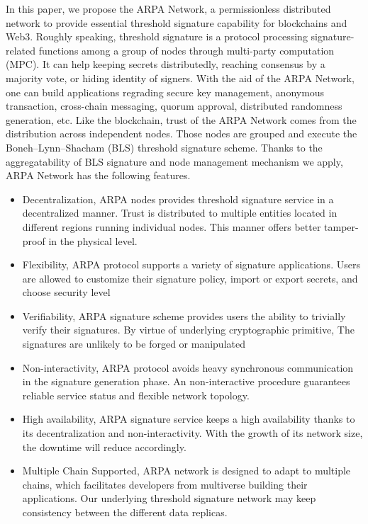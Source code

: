 \documentclass[11pt]{article}
\begin{document}
In this paper, we propose the ARPA Network, a permissionless distributed network to provide essential threshold signature capability for blockchains and Web3. Roughly speaking, threshold signature is a protocol processing signature-related functions among a group of nodes through multi-party computation (MPC). It can help keeping secrets distributedly, reaching consensus by a majority vote, or hiding identity of signers. With the aid of the ARPA Network, one can build applications regrading secure key management, anonymous transaction, cross-chain messaging, quorum approval, distributed randomness generation, etc. Like the blockchain, trust of the ARPA Network comes from the distribution across independent nodes. Those nodes are grouped and execute the Boneh–Lynn–Shacham (BLS) threshold signature scheme. Thanks to the aggregatability of BLS signature and node management mechanism we apply, ARPA Network has the following features.
\begin{itemize}
    \item Decentralization, ARPA nodes provides threshold signature service in a decentralized manner. Trust is distributed to multiple entities located in different regions running individual nodes. This manner offers better tamper-proof in the physical level.
    \item Flexibility, ARPA protocol supports a variety of signature applications. Users are allowed to customize their signature policy, import or export secrets, and choose security level
    \item Verifiability, ARPA signature scheme provides users the ability to trivially verify their signatures. By virtue of underlying cryptographic primitive, The signatures are unlikely to be forged or manipulated
    \item Non-interactivity, ARPA protocol avoids heavy synchronous communication in the signature generation phase. An non-interactive procedure guarantees reliable service status and flexible network topology.
    \item High availability, ARPA signature service keeps a high availability thanks to its decentralization and non-interactivity. With the growth of its network size, the downtime will reduce accordingly.
    \item Multiple Chain Supported, ARPA network is designed to adapt to multiple chains, which facilitates developers from multiverse building their applications. Our underlying threshold signature network may keep consistency between the different data replicas.
\end{itemize}
\end{document}
